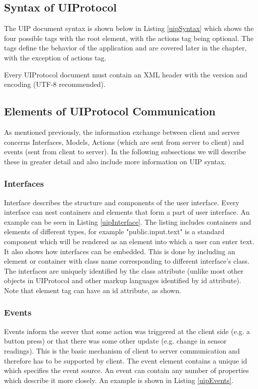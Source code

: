 \subsection{Syntax of UIProtocol}
The UIP document syntax is shown below in Listing \ref{uipSyntax} which shows the four possible tags with the root element, with the actions tag being optional. The tags define the behavior of the application and are covered later in the chapter, with the exception of actions tag.



Every UIProtocol document must contain an XML header with the version and encoding (UTF-8 recommended).

\subsection{Elements of UIProtocol Communication}
As mentioned previously, the information exchange between client and server concerns Interfaces, Models, Actions (which are sent from server to client) and events (sent from client to server). In the following subsections we will describe these in greater detail and also include more information on UIP syntax.

\subsubsection{Interfaces}
Interface describes the structure and components of the user interface. Every interface can nest containers and elements that form a part of user interface. An example can be seen in Listing \ref{uipInterface}. The listing includes containers and elements of different types, for example "public.input.text" is a standard component which will be rendered as an element into which a user can enter text. It also shows how interfaces can be embedded. This is done by including an element or container with class name corresponding to different interface's class. The interfaces are uniquely identified by the class attribute (unlike most other objects in UIProtocol and other markup languages identified by id attribute). Note that element tag can have an id attribute, as shown.\\



\subsubsection{Events}
Events inform the server that some action was triggered at the client side (e.g. a button press) or that there was some other update (e.g. change in sensor readings). This is the basic mechanism of client to server communication and therefore has to be supported by client. The event element contains a unique id which specifies the event source. An event can contain any number of properties which describe it more closely. An example is shown in Listing \ref{uipEvents}.


